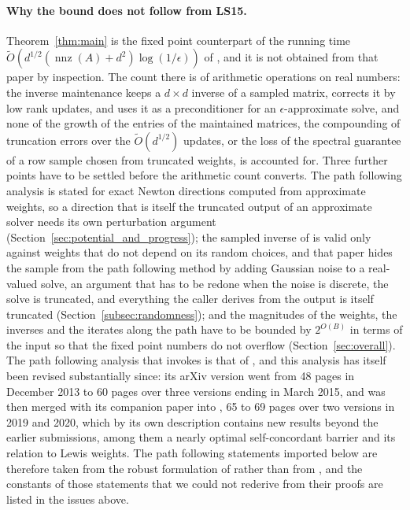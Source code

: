 \documentclass[11pt]{article}
\newcommand{\nnz}{\operatorname{nnz}}
\renewcommand{\O}{\widetilde O}
\begin{document}
\paragraph{Why the bound does not follow from LS15.}
Theorem~\ref{thm:main} is the fixed point counterpart of the running time
$\O(d^{1/2}(\nnz(A) + d^2) \log(1/\epsilon))$ of \cite{LS15}, and
it is not obtained from that paper by inspection.
The count there is of arithmetic operations on real numbers: the inverse
maintenance keeps a $d \times d$ inverse of a sampled matrix, corrects it by low
rank updates, and uses it as a preconditioner for an $\epsilon$-approximate
solve, and none of the growth of the entries of the maintained matrices, the
compounding of truncation errors over the $\O(d^{1/2})$ updates, or the loss of
the spectral guarantee of a row sample chosen from truncated weights, is
accounted for.
Three further points have to be settled before the arithmetic count converts.
The path following analysis is stated for exact Newton directions computed from
approximate weights, so a direction that is itself the truncated output of an
approximate solver needs its own perturbation argument
(Section~\ref{sec:potential_and_progress}); the sampled inverse of
\cite{LS15} is valid only against weights that do not depend on
its random choices, and that paper hides the sample from the path following
method by adding Gaussian noise to a real-valued solve, an argument that has to
be redone when the noise is discrete, the solve is truncated, and everything the
caller derives from the output is itself truncated
(Section~\ref{subsec:randomness}); and the magnitudes of the weights, the
inverses and the iterates along the path have to be bounded by $2^{O(B)}$ in
terms of the input so that the fixed point numbers do not overflow
(Section~\ref{sec:overall}).
The path following analysis that \cite{LS15} invokes is that of
\cite{LS14}, and this analysis has itself been revised substantially
since: its arXiv version \cite{LS13:arxiv} went from 48 pages in
December 2013 to 60 pages over three versions ending in March 2015, and was then
merged with its companion paper into \cite{LS19:arxiv}, 65 to 69 pages
over two versions in 2019 and 2020, which by its own description contains new
results beyond the earlier submissions, among them a nearly optimal
self-concordant barrier and its relation to Lewis weights.
The path following statements imported below are therefore taken from the robust
formulation of \cite{BLLSSSW21} rather than
from \cite{LS14}, and the constants of those statements that we could
not rederive from their proofs are listed in the issues above.
\end{document}

